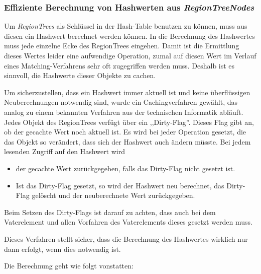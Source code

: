 \subsubsection{Effiziente Berechnung von Hashwerten aus \textit{RegionTreeNodes}}\label{berechenHashwerte}

Um \textit{RegionTrees} als Schlüssel in der Hash-Table benutzen zu können, muss aus diesen ein Hashwert berechnet werden können. In die Berechnung des Hashwertes muss jede einzelne Ecke des RegionTrees eingehen. Damit ist die Ermittlung dieses Wertes leider eine aufwendige Operation, zumal auf diesen Wert im Verlauf eines Matching-Verfahrens sehr oft zugegriffen werden muss. Deshalb ist es sinnvoll, die Hashwerte dieser Objekte zu cachen. 

Um sicherzustellen, dass ein Hashwert immer aktuell ist und keine überflüssigen Neuberechnungen notwendig sind, wurde ein Cachingverfahren gewählt, das analog zu einem bekannten Verfahren aus der technischen Informatik abläuft. Jedes Objekt des RegionTrees verfügt über ein ,,Dirty-Flag''. Dieses Flag gibt an, ob der gecachte Wert noch aktuell ist. Es wird bei jeder Operation gesetzt, die das Objekt so verändert, dass sich der Hashwert auch ändern müsste. Bei jedem lesenden Zugriff auf den Hashwert wird 
\begin{itemize}
\item der gecachte Wert zurückgegeben, falls das Dirty-Flag nicht gesetzt ist.
\item Ist das Dirty-Flag gesetzt, so wird der Hashwert neu berechnet, das Dirty-Flag gelöscht und der neuberechnete Wert zurückgegeben.
\end{itemize}

Beim Setzen des Dirty-Flags ist darauf zu achten, dass auch bei dem Vaterelement und allen Vorfahren des Vaterelements dieses gesetzt werden muss.

Dieses Verfahren stellt sicher, dass die Berechnung des Hashwertes wirklich nur dann erfolgt, wenn dies notwendig ist.

Die Berechnung geht wie folgt vonstatten:

